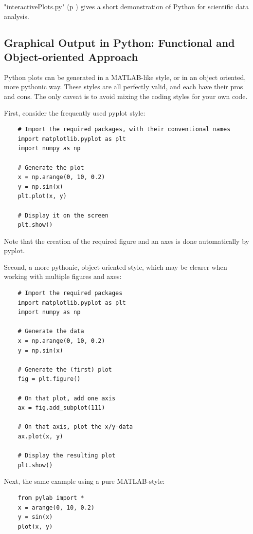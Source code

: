 \PyImg "interactivePlots.py" (p \pageref{py:interactivePlots}) gives a short demonstration of Python for scientific data analysis.

\subsection{Graphical Output in Python: Functional and Object-oriented Approach}

Python plots can be generated in a MATLAB-like style, or in an object oriented, more pythonic way. These styles are all perfectly valid, and each have their pros and cons. The only caveat is to avoid mixing the coding styles for your own code.

First, consider the frequently used pyplot style:

\begin{lstlisting}
    # Import the required packages, with their conventional names
    import matplotlib.pyplot as plt
    import numpy as np

    # Generate the plot
    x = np.arange(0, 10, 0.2)
    y = np.sin(x)
    plt.plot(x, y)

    # Display it on the screen
    plt.show()
\end{lstlisting}

Note that the creation of the required figure and an axes is done automatically by pyplot.

Second, a more pythonic, object oriented style, which may be clearer when working with multiple figures and axes:

\begin{lstlisting}
    # Import the required packages
    import matplotlib.pyplot as plt
    import numpy as np

    # Generate the data
    x = np.arange(0, 10, 0.2)
    y = np.sin(x)

    # Generate the (first) plot
    fig = plt.figure()

    # On that plot, add one axis
    ax = fig.add_subplot(111)

    # On that axis, plot the x/y-data
    ax.plot(x, y)

    # Display the resulting plot
    plt.show()
\end{lstlisting}

Next, the same example using a pure MATLAB-style:

\begin{lstlisting}
    from pylab import *
    x = arange(0, 10, 0.2)
    y = sin(x)
    plot(x, y)
\end{lstlisting}

